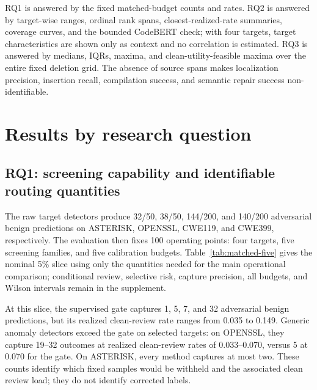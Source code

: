 \documentclass[a4paper,fleqn]{cas-dc}
\newcommand{\dataset}[1]{\textsc{#1}}
\begin{document}
RQ1 is answered by the fixed matched-budget counts and rates. RQ2 is answered by target-wise ranges, ordinal rank spans, closest-realized-rate summaries, coverage curves, and the bounded CodeBERT check; with four targets, target characteristics are shown only as context and no correlation is estimated. RQ3 is answered by medians, IQRs, maxima, and clean-utility-feasible maxima over the entire fixed deletion grid. The absence of source spans makes localization precision, insertion recall, compilation success, and semantic repair success non-identifiable.

\section{Results by research question}\label{sec:results}

\subsection{RQ1: screening capability and identifiable routing quantities}

The raw target detectors produce 32/50, 38/50, 144/200, and 140/200 adversarial benign predictions on \dataset{ASTERISK}, \dataset{OPENSSL}, \dataset{CWE119}, and \dataset{CWE399}, respectively. The evaluation then fixes 100 operating points: four targets, five screening families, and five calibration budgets. Table~\ref{tab:matched-five} gives the nominal 5\% slice using only the quantities needed for the main operational comparison; conditional review, selective risk, capture precision, all budgets, and Wilson intervals remain in the supplement.

At this slice, the supervised gate captures 1, 5, 7, and 32 adversarial benign predictions, but its realized clean-review rate ranges from 0.035 to 0.149. Generic anomaly detectors exceed the gate on selected targets: on \dataset{OPENSSL}, they capture 19--32 outcomes at realized clean-review rates of 0.033--0.070, versus 5 at 0.070 for the gate. On \dataset{ASTERISK}, every method captures at most two. These counts identify which fixed samples would be withheld and the associated clean review load; they do not identify corrected labels.

\end{document}
